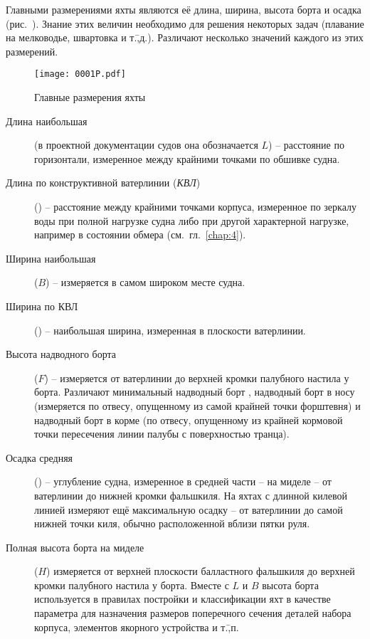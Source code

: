 Главными размерениями яхты являются её длина,
ширина,
высота борта и
осадка (рис.~). Знание этих
величин необходимо для решения некоторых задач (плавание на
мелководье, швартовка и т.\=,д.). Различают несколько значений каждого
из этих размерений.

\begin{figure*}[htb]
   \centering
   \texttt{[image: 0001P.pdf]}
   \caption{Главные размерения яхты}
   \label{fig:1}
\end{figure*}

\begin{description}
\item [Длина наибольшая] (в проектной
  документации судов она обозначается $L$) \--- расстояние по
  горизонтали, измеренное между крайними точками по обшивке судна.
\item [Длина по конструктивной ватерлинии
  (\textit{КВЛ})] (\lkvl) \--- расстояние
  между крайними точками корпуса, измеренное по зеркалу воды при
  полной нагрузке судна либо при другой характерной нагрузке, например
  в состоянии обмера (см.~гл.~\ref{chap:4}).
\item [Ширина наибольшая] ($B$) \---
  измеряется в самом широком месте судна.
\item [Ширина по КВЛ]
  (\bkvl) \--- наибольшая ширина, измеренная в плоскости ватерлинии.
\item [Высота надводного борта] ($F$)
  \--- измеряется от ватерлинии до верхней кромки палубного настила у
  борта. Различают минимальный надводный борт , надводный
  борт в носу  (измеряется по отвесу, опущенному из самой
  крайней точки форштевня) и надводный борт в корме  (по
  отвесу, опущенному из крайней кормовой точки пересечения линии
  палубы с поверхностью транца).
\item [Осадка средняя] (\tsr) \--- углубление
  судна, измеренное в средней части \--- на миделе \--- от ватерлинии
  до нижней кромки фальшкиля. На яхтах с длинной килевой линией
  измеряют ещё максимальную осадку \--- от ватерлинии до самой нижней
  точки киля, обычно расположенной вблизи пятки руля.
\item [Полная высота борта на миделе]
  ($H$) измеряется от верхней плоскости балластного
  фальшкиля до верхней кромки палубного настила у борта. Вместе с $L$
  и $B$ высота борта используется в правилах постройки и классификации
  яхт в качестве параметра для назначения размеров поперечного сечения
  деталей набора корпуса, элементов якорного устройства и т.\=,п.
\end{description}

